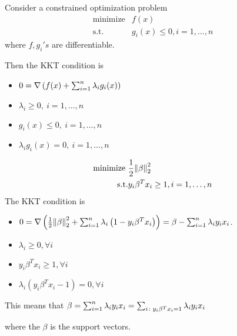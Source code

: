 \begin{definition}
    Consider a constrained optimization problem 
    \begin{align*}
        \text{minimize} &f(x) \\ 
        \text{s.t.}     &g_i (x) \leq 0, i = 1, \ldots, n 
    \end{align*}
    where \(f, g_i's\) are differentiable. 

    Then the KKT condition is  
    \begin{itemize}
        \item \(0 = \nabla \left( f(x) + \sum_{i=1}^n \lambda_i g_i (x)  \right)\)
        \item \(\lambda_i \geq 0, \ i = 1, \ldots, n\)
        \item \(g_i (x) \leq 0, \ i = 1, \ldots, n\)
        \item \(\lambda_i g_i (x) = 0, \ i = 1, \ldots, n\)
    \end{itemize}
\end{definition}


\begin{eg}
    \begin{align*}
        \text{minimize } & \frac{1}{2} \norm{\beta}_2^2 \\ 
        \text{s.t.}     &y_i \beta^T x_i \geq 1, i = 1, \ldots, n 
    \end{align*}
    The KKT condition is 
    \begin{itemize}
        \item \(0 = \nabla  \left( \frac{1}{2}\norm{\beta}_2^2 + \sum_{i=1}^n \lambda_i \left(1 - y_i \beta^T x_i\right) \right) = \beta - \sum_{i=1}^n \lambda_i y_i x_i\). 
        \item \(\lambda_i \geq 0, \forall i\)
        \item \(y_i \beta^T x_i \geq 1, \forall i\)
        \item \(\lambda_i( y_i \beta^T x_i - 1) = 0, \forall i\)
    \end{itemize}

    This means that \(\beta = \sum_{i=1}^n \lambda_i y_i x_i = \sum_{i \colon y_i \beta^T x_i = 1} \lambda_i y_i x_i\)

    where the \(\beta\) is the support vectors. 
\end{eg}

